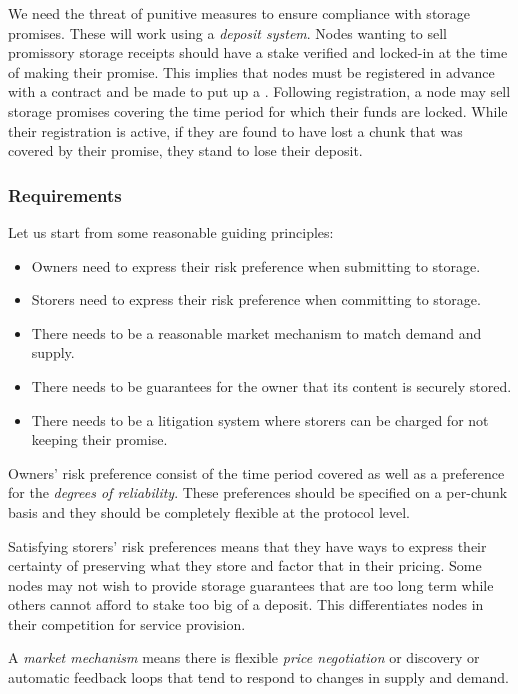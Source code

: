 We need the threat of punitive measures to ensure compliance with storage promises. These will work using a \emph{deposit system}. Nodes wanting to sell promissory storage receipts should have a stake verified and locked-in at the time of making their promise. This implies that nodes must be registered in advance with a contract and be made to put up a . Following registration, a node may sell storage promises covering the time period for which their funds are locked. While their registration is active, if they are found to have lost a chunk that was covered by their promise, they stand to lose their deposit.

\subsubsection{Requirements}

Let us start from some reasonable guiding principles:

\begin{itemize}
\item Owners need to express their risk preference when submitting to storage.
\item Storers need to express their risk preference when committing to storage.
\item There needs to be a reasonable market mechanism to match demand and supply.
\item There needs to be guarantees for the owner that its content is securely stored.
\item There needs to be a litigation system where storers can be charged for not keeping their promise.
\end{itemize}

Owners' risk preference consist of the time period covered as well as a preference for the \emph{degrees of reliability}. These preferences should be specified on a per-chunk basis and they should be completely flexible at the protocol level.

Satisfying storers' risk preferences means that they have ways to express their certainty of preserving what they store and factor that in their pricing. Some nodes may not wish to provide storage guarantees that are too long term while others cannot afford to stake too big of a deposit. This differentiates nodes in their competition for service provision.

A \emph{market mechanism} means there is flexible \emph{price negotiation} or discovery or automatic feedback loops that tend to respond to changes in supply and demand.

